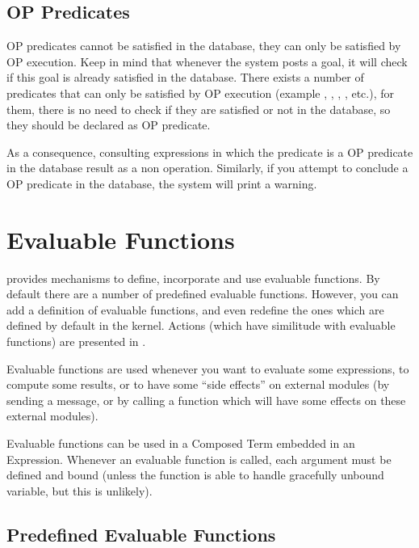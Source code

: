 \section{OP Predicates}

OP predicates cannot be satisfied in the database, they
can only be satisfied by OP execution. Keep in mind that whenever the system
posts a goal, it will check if this goal is already satisfied in the database.
There exists a number of predicates that can only be satisfied by OP execution
(example , ,
, , etc.), for them, there is no need to
check if they are satisfied or not in the database, so they should be declared
as OP predicate. 

As a consequence, consulting expressions in which the predicate is a OP predicate in
the database result as a non operation.  Similarly, if you attempt to conclude
a OP predicate in the database, the system will print a warning.

\chapter{Evaluable Functions}

\COPRS{} provides mechanisms to define, incorporate and use evaluable
functions. By default there are a number of predefined evaluable functions.
However, you can add a definition of evaluable functions, and even
redefine the ones which are defined by default in the kernel. Actions (which
have similitude with evaluable functions) are presented in .

Evaluable functions are used whenever you want to evaluate some expressions, to
compute some results, or to have some ``side effects'' on external modules (by
sending a message, or by calling a function which will have some effects on
these external modules).

Evaluable functions can be used in a Composed Term embedded in an Expression.
Whenever an evaluable function is called, each argument must be defined and
bound (unless the function is able to handle gracefully unbound variable, but this is
unlikely).



\section{Predefined Evaluable Functions}

